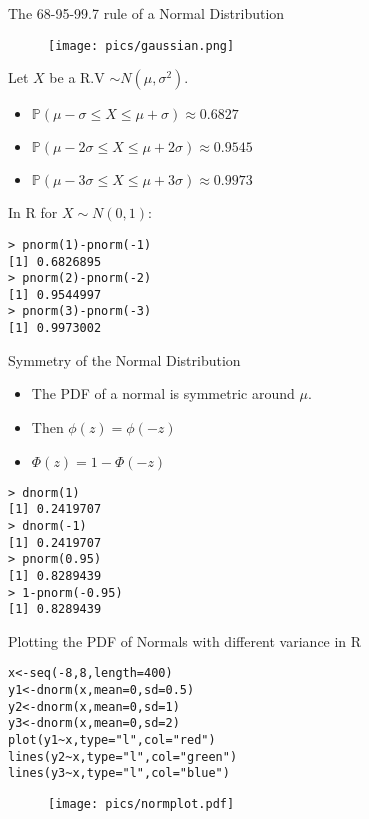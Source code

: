 \documentclass[handout]{beamer}
\begin{document}
\begin{frame}[fragile]{The 68-95-99.7 rule of a Normal Distribution}
\scriptsize{
\begin{figure}[h!]
	\centering
	\texttt{[image: pics/gaussian.png]}
\end{figure} 
Let $X$ be a R.V $\sim N(\mu,\sigma^2)$.
\begin{itemize}
 \item $\mathbb{P}( \mu - \sigma \leq X \leq \mu+ \sigma) \approx 0.6827$  
 \item $\mathbb{P}( \mu - 2 \sigma \leq X \leq \mu+ 2 \sigma) \approx 0.9545$               
 \item $\mathbb{P}( \mu - 3 \sigma \leq X \leq \mu+ 3 \sigma) \approx 0.9973$ 

\end{itemize}
In R for $X\sim N(0,1)$:
\begin{verbatim}
> pnorm(1)-pnorm(-1)
[1] 0.6826895
> pnorm(2)-pnorm(-2)
[1] 0.9544997
> pnorm(3)-pnorm(-3)
[1] 0.9973002 
\end{verbatim}
}
\end{frame}

\begin{frame}[fragile]{Symmetry of the Normal Distribution}
\begin{itemize}
 \item The PDF of a normal is symmetric around $\mu$.
 \item Then $\phi(z)= \phi(-z) $ 
 \item $\Phi(z)=1-\Phi(-z)$
\end{itemize}
\begin{verbatim}
> dnorm(1)
[1] 0.2419707
> dnorm(-1)
[1] 0.2419707
> pnorm(0.95)
[1] 0.8289439
> 1-pnorm(-0.95)
[1] 0.8289439 
\end{verbatim}


\end{frame}

\begin{frame}[fragile]{Plotting the PDF of Normals with different variance in R}
\scriptsize{
\begin{verbatim}
x<-seq(-8,8,length=400)
y1<-dnorm(x,mean=0,sd=0.5)
y2<-dnorm(x,mean=0,sd=1) 
y3<-dnorm(x,mean=0,sd=2)
plot(y1~x,type="l",col="red")
lines(y2~x,type="l",col="green")
lines(y3~x,type="l",col="blue")
\end{verbatim}
}
 \begin{figure}[h!]
	\centering
	\texttt{[image: pics/normplot.pdf]}
\end{figure}



\end{frame}
\end{document}
